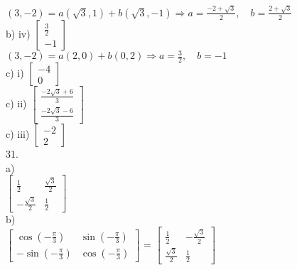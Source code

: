 \documentclass[12pt]{article}
\begin{document}
$(3,-2)=a(\sqrt{3},1)+b(\sqrt{3},-1) \Longrightarrow a=\frac{-2+\sqrt{3}}{2},\quad b=\frac{2+\sqrt{3}}{2}$\\
b) iv) $\begin{bmatrix}\frac{3}{2}\\-1\end{bmatrix}$\\
$(3,-2)=a(2,0)+b(0,2) \Longrightarrow a=\frac{3}{2},\quad b=-1$\\
c) i) $\begin{bmatrix}-4\\0\end{bmatrix}$\\
c) ii) $\begin{bmatrix}\frac{-2\sqrt{3}+6}{3}\\\frac{-2\sqrt{3}-6}{3}\end{bmatrix}$\\
c) iii) $\begin{bmatrix}-2\\2\end{bmatrix}$\\

31.\\
a)\\
$\begin{bmatrix}\frac{1}{2}&\frac{\sqrt{3}}{2}\\-\frac{\sqrt{3}}{2}&\frac{1}{2}\end{bmatrix}$\\
b)\\
$\begin{bmatrix}\cos(-\frac{\pi}{3})&\sin(-\frac{\pi}{3})\\-\sin(-\frac{\pi}{3})&\cos(-\frac{\pi}{3})\end{bmatrix}$ = $\begin{bmatrix}\frac{1}{2}&-\frac{\sqrt{3}}{2}\\\frac{\sqrt{3}}{2}&\frac{1}{2}\end{bmatrix}$\\
\end{document}
